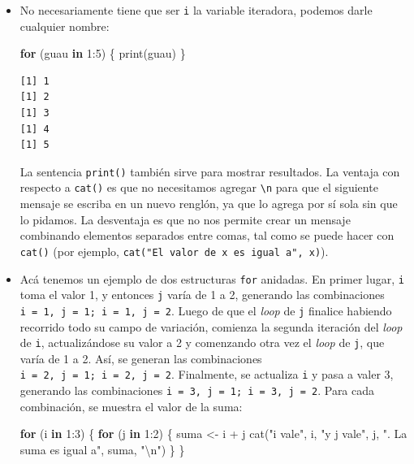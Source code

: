 \documentclass[
]{book}
\newenvironment{Shaded}{\begin{snugshade}}{\end{snugshade}}
\newcommand{\ControlFlowTok}[1]{\textcolor[rgb]{0.13,0.29,0.53}{\textbf{#1}}}
\newcommand{\DecValTok}[1]{\textcolor[rgb]{0.00,0.00,0.81}{#1}}
\newcommand{\FunctionTok}[1]{\textcolor[rgb]{0.00,0.00,0.00}{#1}}
\newcommand{\NormalTok}[1]{#1}
\newcommand{\OtherTok}[1]{\textcolor[rgb]{0.56,0.35,0.01}{#1}}
\newcommand{\SpecialCharTok}[1]{\textcolor[rgb]{0.00,0.00,0.00}{#1}}
\newcommand{\StringTok}[1]{\textcolor[rgb]{0.31,0.60,0.02}{#1}}
\begin{document}
\begin{itemize}
\item
  No necesariamente tiene que ser \texttt{i} la variable iteradora, podemos darle cualquier nombre:

\begin{Shaded}
\begin{Highlighting}[]
\ControlFlowTok{for}\NormalTok{ (guau }\ControlFlowTok{in} \DecValTok{1}\SpecialCharTok{:}\DecValTok{5}\NormalTok{) \{}
    \FunctionTok{print}\NormalTok{(guau)}
\NormalTok{\}}
\end{Highlighting}
\end{Shaded}

\begin{verbatim}
[1] 1
[1] 2
[1] 3
[1] 4
[1] 5
\end{verbatim}

  La sentencia \texttt{print()} también sirve para mostrar resultados. La ventaja con respecto a \texttt{cat()} es que no necesitamos agregar \texttt{\textbackslash{}n} para que el siguiente mensaje se escriba en un nuevo renglón, ya que lo agrega por sí sola sin que lo pidamos. La desventaja es que no nos permite crear un mensaje combinando elementos separados entre comas, tal como se puede hacer con \texttt{cat()} (por ejemplo, \texttt{cat("El\ valor\ de\ x\ es\ igual\ a",\ x)}).
\item
  Acá tenemos un ejemplo de dos estructuras \texttt{for} anidadas. En primer lugar, \texttt{i} toma el valor 1, y entonces \texttt{j} varía de 1 a 2, generando las combinaciones \texttt{i\ =\ 1,\ j\ =\ 1;\ i\ =\ 1,\ j\ =\ 2}. Luego de que el \emph{loop} de \texttt{j} finalice habiendo recorrido todo su campo de variación, comienza la segunda iteración del \emph{loop} de \texttt{i}, actualizándose su valor a 2 y comenzando otra vez el \emph{loop} de \texttt{j}, que varía de 1 a 2. Así, se generan las combinaciones \texttt{i\ =\ 2,\ j\ =\ 1;\ i\ =\ 2,\ j\ =\ 2}. Finalmente, se actualiza \texttt{i} y pasa a valer 3, generando las combinaciones \texttt{i\ =\ 3,\ j\ =\ 1;\ i\ =\ 3,\ j\ =\ 2}. Para cada combinación, se muestra el valor de la suma:

\begin{Shaded}
\begin{Highlighting}[]
\ControlFlowTok{for}\NormalTok{ (i }\ControlFlowTok{in} \DecValTok{1}\SpecialCharTok{:}\DecValTok{3}\NormalTok{) \{}
    \ControlFlowTok{for}\NormalTok{ (j }\ControlFlowTok{in} \DecValTok{1}\SpecialCharTok{:}\DecValTok{2}\NormalTok{) \{}
\NormalTok{        suma }\OtherTok{\textless{}{-}}\NormalTok{ i }\SpecialCharTok{+}\NormalTok{ j}
        \FunctionTok{cat}\NormalTok{(}\StringTok{"i vale"}\NormalTok{, i, }\StringTok{"y j vale"}\NormalTok{, j, }\StringTok{". La suma es igual a"}\NormalTok{, suma, }\StringTok{"}\SpecialCharTok{\textbackslash{}n}\StringTok{"}\NormalTok{) }
\NormalTok{    \}}
\NormalTok{\}}
\end{Highlighting}
\end{Shaded}


\end{itemize}
\end{document}
